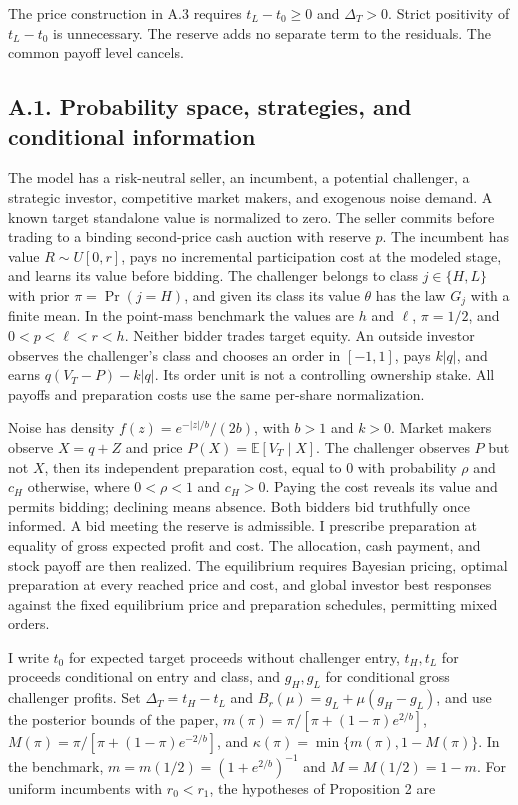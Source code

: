 \documentclass[
  11pt,
]{article}
\begin{document}
The price construction in A.3 requires \(t_L-t_0\ge0\) and \(\Delta_T>0\).
Strict positivity of \(t_L-t_0\) is unnecessary.
The reserve adds no separate term to the residuals.
The common payoff level cancels.

\subsection{A.1. Probability space, strategies, and conditional
information}\label{oa-a-foundations}

The model has a risk-neutral seller, an incumbent, a potential
challenger, a strategic investor, competitive market makers, and
exogenous noise demand. A known target standalone value is normalized to
zero. The seller commits before trading to a binding second-price cash
auction with reserve \(p\). The incumbent has value \(R\sim U[0,r]\),
pays no incremental participation cost at the modeled stage, and learns
its value before bidding. The challenger belongs to class
\(j\in\{H,L\}\) with prior \(\pi=\Pr(j=H)\), and given its class its value
\(\theta\) has the law \(G_j\) with a finite mean. In the point-mass
benchmark the values are \(h\) and \(\ell\), \(\pi=1/2\), and
\(0<p<\ell<r<h\). Neither bidder trades target equity. An outside investor
observes the challenger's class and
chooses an order in \([-1,1]\), pays \(k|q|\), and earns
\(q(V_T-P)-k|q|\). Its order unit is not a controlling ownership stake.
All payoffs and preparation costs use the same per-share normalization.

Noise has density \(f(z)=e^{-|z|/b}/(2b)\), with \(b>1\) and \(k>0\).
Market makers observe \(X=q+Z\) and price \(P(X)=\mathbb E[V_T\mid X]\).
The challenger observes \(P\) but not \(X\), then its independent
preparation cost, equal to \(0\) with probability \(\rho\) and \(c_H\)
otherwise, where \(0<\rho<1\) and \(c_H>0\). Paying the cost
reveals its value and permits bidding; declining means absence. Both
bidders bid truthfully once informed. A bid meeting the reserve is
admissible. I prescribe preparation at equality of gross expected profit
and cost. The allocation, cash payment, and stock payoff are then
realized. The equilibrium requires Bayesian pricing, optimal preparation
at every reached price and cost, and global investor best responses
against the fixed equilibrium price and preparation schedules,
permitting mixed orders.

I write \(t_0\) for expected target proceeds without challenger entry,
\(t_H,t_L\) for proceeds conditional on entry and class, and
\(g_H,g_L\) for conditional gross challenger profits. Set
\(\Delta_T=t_H-t_L\) and \(B_r(\mu)=g_L+\mu(g_H-g_L)\), and use the
posterior bounds of the paper,
\(m(\pi)=\pi/[\pi+(1-\pi)e^{2/b}]\),
\(M(\pi)=\pi/[\pi+(1-\pi)e^{-2/b}]\), and
\(\kappa(\pi)=\min\{m(\pi),1-M(\pi)\}\). In the benchmark,
\(m=m(1/2)=(1+e^{2/b})^{-1}\) and \(M=M(1/2)=1-m\). For uniform
incumbents with \(r_0<r_1\), the hypotheses of Proposition 2 are
\end{document}
